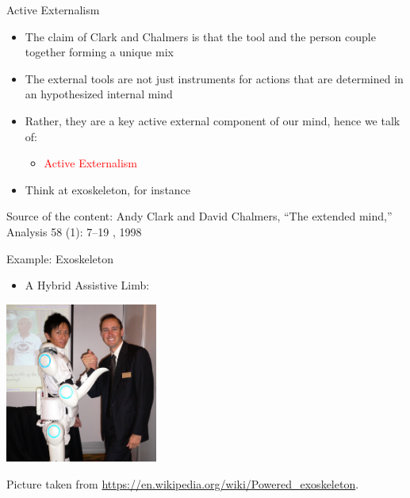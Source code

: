 \documentclass{beamer}
\begin{document}
\begin{frame}
{\centerline{Active Externalism}}
\begin{itemize}
    \item The claim of Clark and Chalmers is that the tool and the person couple together forming a unique mix
    \item The external tools are not just instruments for actions that are determined in an hypothesized internal mind
    \item Rather, they are a key active external component of our mind, hence we talk of:
    \begin{itemize}
    \item \textcolor{red}{Active Externalism}
\end{itemize} 
     \item Think at exoskeleton, for instance 
\end{itemize} 

\begin{center}
    \tiny{Source of the content: Andy Clark and David Chalmers, ``The extended mind,'' Analysis 58 (1): 7--19 , 1998}
\end{center}

\end{frame}

\begin{frame}
{\centerline{Example: Exoskeleton}}

\begin{itemize}
    \item A Hybrid Assistive Limb:
\end{itemize} 

\begin{center}
 \includegraphics[width=5cm]{P2023.AIBCCSS.ExtendedMindDistributedCognitionSystemicThinking/Hybrid_Assistive_Limb.jpg}
 
 \end{center}
 
\begin{center}
    \tiny{Picture taken from \url{https://en.wikipedia.org/wiki/Powered_exoskeleton}.}
\end{center}
\end{frame}
\end{document}
